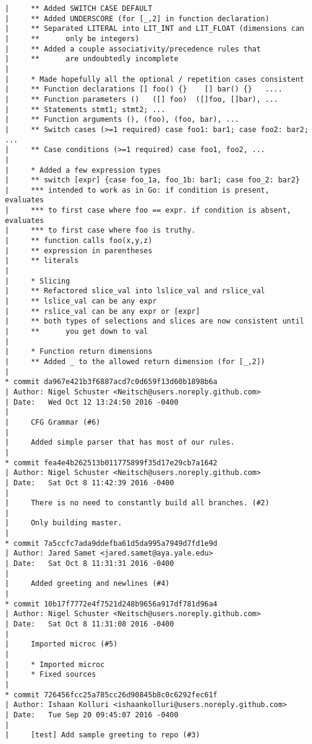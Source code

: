 \begin{lstlisting}
|     ** Added SWITCH CASE DEFAULT
|     ** Added UNDERSCORE (for [_,2] in function declaration)
|     ** Separated LITERAL into LIT_INT and LIT_FLOAT (dimensions can
|     **      only be integers)
|     ** Added a couple associativity/precedence rules that
|     **      are undoubtedly incomplete
|     
|     * Made hopefully all the optional / repetition cases consistent
|     ** Function declarations [] foo() {}    [] bar() {}   ....
|     ** Function parameters ()   ([] foo)  ([]foo, []bar), ...
|     ** Statements stmt1; stmt2; ...
|     ** Function arguments (), (foo), (foo, bar), ...
|     ** Switch cases (>=1 required) case foo1: bar1; case foo2: bar2; ...
|     ** Case conditions (>=1 required) case foo1, foo2, ...
|     
|     * Added a few expression types
|     ** switch [expr] {case foo_1a, foo_1b: bar1; case foo_2: bar2}
|     *** intended to work as in Go: if condition is present, evaluates
|     *** to first case where foo == expr. if condition is absent, evaluates
|     *** to first case where foo is truthy.
|     ** function calls foo(x,y,z)
|     ** expression in parentheses
|     ** literals
|     
|     * Slicing
|     ** Refactored slice_val into lslice_val and rslice_val
|     ** lslice_val can be any expr
|     ** rslice_val can be any expr or [expr]
|     ** both types of selections and slices are now consistent until
|     **      you get down to val
|     
|     * Function return dimensions
|     ** Added _ to the allowed return dimension (for [_,2])
|  
* commit da967e421b3f6887acd7c0d659f13d60b1898b6a
| Author: Nigel Schuster <Neitsch@users.noreply.github.com>
| Date:   Wed Oct 12 13:24:50 2016 -0400
| 
|     CFG Grammar (#6)
|     
|     Added simple parser that has most of our rules.
|  
* commit fea4e4b262513b011775899f35d17e29cb7a1642
| Author: Nigel Schuster <Neitsch@users.noreply.github.com>
| Date:   Sat Oct 8 11:42:39 2016 -0400
| 
|     There is no need to constantly build all branches. (#2)
|     
|     Only building master.
|  
* commit 7a5ccfc7ada9ddefba61d5da995a7949d7fd1e9d
| Author: Jared Samet <jared.samet@aya.yale.edu>
| Date:   Sat Oct 8 11:31:31 2016 -0400
| 
|     Added greeting and newlines (#4)
|  
* commit 10b17f7772e4f7521d248b9656a917df781d96a4
| Author: Nigel Schuster <Neitsch@users.noreply.github.com>
| Date:   Sat Oct 8 11:31:08 2016 -0400
| 
|     Imported microc (#5)
|     
|     * Imported microc
|     * Fixed sources
|  
* commit 726456fcc25a785cc26d90845b8c0c6292fec61f
| Author: Ishaan Kolluri <ishaankolluri@users.noreply.github.com>
| Date:   Tue Sep 20 09:45:07 2016 -0400
| 
|     [test] Add sample greeting to repo (#3)

\end{lstlisting}

